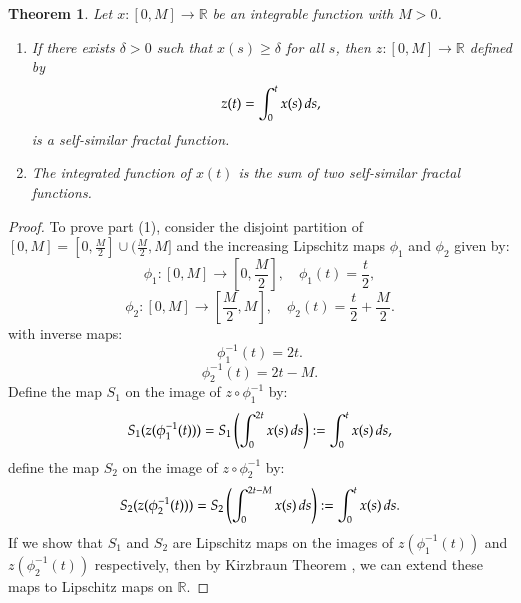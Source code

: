 \documentclass{amsart}
\newtheorem{theorem}{Theorem}[section]
\newcommand{\R}{{\mathbb{R}}}
\begin{document}
\begin{theorem}\label{fra}
Let $x:[0,M]\rightarrow \R$ be an integrable function with $M>0$. 
\begin{enumerate}
    \item If there exists $\delta>0$ such that $x(s)\geq \delta$ for all $s$, then $z\colon[0,M]\to\R$ defined by
    \begin{equation*}
        z(t)= \int_0^t x(s) \thinspace ds,
    \end{equation*}
    is a self-similar fractal function.
    
    \item The integrated function of $x(t)$ is the sum of two self-similar fractal functions.
\end{enumerate}
\end{theorem}
\begin{proof}
 To prove part (1), consider the disjoint partition of  $[0,M]=[0,\frac{M}{2}]\cup(\frac{M}{2},M]$ and the increasing Lipschitz maps $\phi_1$ and $\phi_2$ given by:
\begin{equation*}
    \phi_1:[0,M]\rightarrow \left[0,\frac{M}{2}\right],\quad \phi_1(t)=\frac{t}{2},
\end{equation*}
\begin{equation*}
    \phi_2:[0,M]\rightarrow \left[\frac{M}{2},M\right],\quad \phi_2(t)=\frac{t}{2}+\frac{M}{2}.
\end{equation*}
with inverse maps:
\begin{equation*}
    \phi^{-1}_1(t)=2t. 
\end{equation*}
\begin{equation*}
    \phi^{-1}_2(t)=2t-M.
\end{equation*}
Define the map $S_1$ on the image of  $z\circ \phi^{-1}_1$ by:
\begin{equation*}
    S_1(z(\phi^{-1}_1(t)))=S_1\left(\int_{0}^{2t} x(s)\thinspace  ds\right):=\int_{0}^{t} x(s)\thinspace ds,
\end{equation*}
 define the map $S_2$ on  the image of  $z\circ \phi_2^{-1}$ by:\\
\begin{equation*}
    S_2(z(\phi^{-1}_2(t)))=S_2\left(\int_{0}^{2t-M} x(s)\thinspace  ds\right):=\int_{0}^{t} x(s)\thinspace ds.
\end{equation*}
If we show that 
$S_1$ and $S_2$ are Lipschitz maps on the images of  $z(\phi^{-1}_1(t))$ and $z(\phi^{-1}_2(t))$ respectively, then by Kirzbraun Theorem \cite{fed}, we can extend these maps to Lipschitz maps on $\R$.
 

\end{proof}
\end{document}
